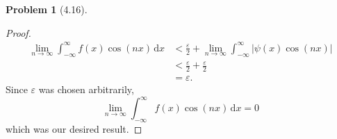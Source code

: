 \documentclass[12pt]{article}
\renewcommand{\epsilon}{\varepsilon}
\newcommand{\dif}{\, \mathrm{d}}
\theoremstyle{definition}
\newtheorem{problem}{Problem}
\begin{document}
\begin{problem}[4.16]
\begin{proof}
            \begin{align*}
                \lim_{n \to \infty} \int_{-\infty}^{\infty} f(x) \cos(nx) \dif x &< \frac{\epsilon}{2} + \lim_{n \to \infty} \int_{-\infty}^{\infty} \left| \psi(x) \cos(nx)  \right| \\
                &< \frac{\epsilon}{2} + \frac{\epsilon}{2} \\
                &= \epsilon.
            \end{align*}
        Since \( \epsilon \) was chosen arbitrarily, 
            \[
                \lim_{n \to \infty} \int_{-\infty}^{\infty} f(x) \cos(nx) \dif x = 0 
            \]
        which was our desired result.
    \end{proof}


\end{problem}  
\end{document}
